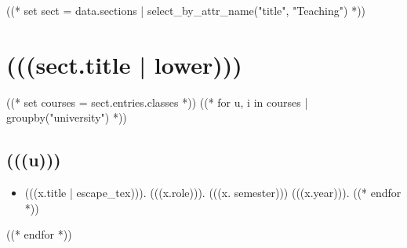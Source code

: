 \documentclass[11pt,article,oneside]{memoir}
\begin{document}
%
%

((* set sect = data.sections | select_by_attr_name("title", "Teaching") *))
\section{(((sect.title | lower)))}

\mbox{}\vspace{-\dimexpr\baselineskip\relax}

\vspace{\baselineskip}

((* set courses = sect.entries.classes *))
((* for u, i in courses | groupby("university")  *))
\subsection{(((u)))}
\begin{itemize}[label={}]
  ((* for x in i | sort_first_year("year", reverse=True) *))
  \item (((x.title | escape_tex))). (((x.role))). (((x. semester))) (((x.year))).
        ((* endfor *))
\end{itemize}
((* endfor *))

%
%
\end{document}
